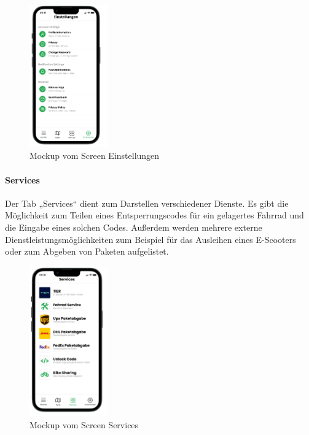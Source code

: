 \begin{figure}[H]
  \centering
  \includegraphics[width=0.3\textwidth]{images/app_mock_settings}
  \caption{\Gls{Mockup} vom Screen Einstellungen}
  \label{fig:screensettingsmock}
\end{figure}

\bigskip


\paragraph{Services}Der \Gls{Tab} „Services“ dient zum Darstellen verschiedener Dienste. Es gibt die Möglichkeit zum Teilen eines Entsperrungscodes für ein gelagertes Fahrrad und die Eingabe eines solchen Codes. Außerdem werden mehrere externe Dienstleistungsmöglichkeiten zum Beispiel für das Ausleihen eines E-Scooters oder zum Abgeben von Paketen aufgelistet.

\begin{figure}[H]
  \centering
  \includegraphics[width=0.3\textwidth]{images/app_mock_services}
  \caption{\Gls{Mockup} vom Screen Services}
  \label{fig:screenservicesmock}
\end{figure}

